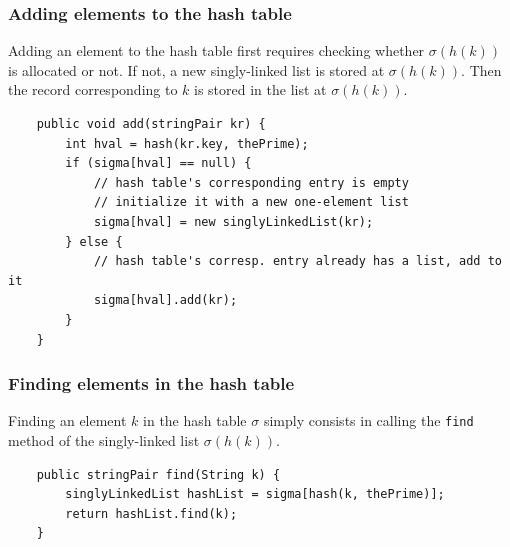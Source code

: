 \documentclass[a4paper]{book}
\theoremstyle{changebreak}                %
\begin{document}
\subsubsection{Adding elements to the hash table}
Adding an element to the hash table first requires checking whether
$\sigma(h(k))$ is allocated or not. If not, a new singly-linked
list is stored at $\sigma(h(k))$. Then the
record corresponding to $k$ is stored in the list at $\sigma(h(k))$.
\begin{verbatim}
    public void add(stringPair kr) {
        int hval = hash(kr.key, thePrime);
        if (sigma[hval] == null) {
            // hash table's corresponding entry is empty
            // initialize it with a new one-element list
            sigma[hval] = new singlyLinkedList(kr);
        } else {
            // hash table's corresp. entry already has a list, add to it
            sigma[hval].add(kr);
        }
    }
\end{verbatim}

\subsubsection{Finding elements in the hash table}
Finding an element $k$ in the hash table
$\sigma$ simply consists in calling the {\tt find}
method of the singly-linked list
$\sigma(h(k))$.
\begin{verbatim}
    public stringPair find(String k) {
        singlyLinkedList hashList = sigma[hash(k, thePrime)];
        return hashList.find(k);
    }
\end{verbatim}
\end{document}
